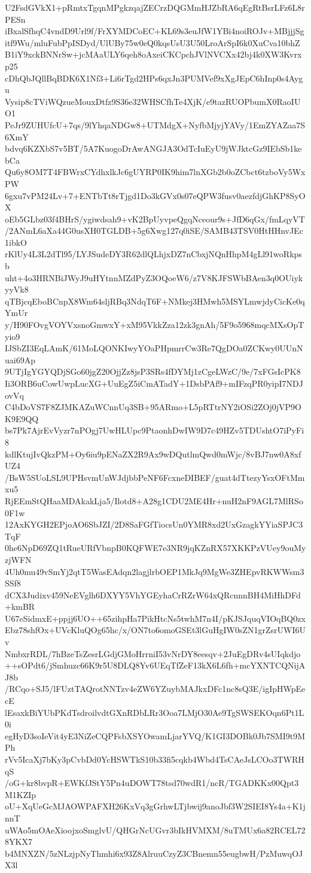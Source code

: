 U2FsdGVkX1+pRmtxTgqnMPgkzqajZECrzDQGMmHJZbRA6qEgRtBsrLFz6L8rPESn
iBxalSfhqC4vndD9Url9f/FrXYMDCoEC+KL69s3euJfW1YBi4noiROJv+MBjjjSg
itf9Wu/mluFubPpISDyd/UlUBy75w0eQ0kqsUsU3U50LroArSpI6k0XuCva10bhZ
B1iY9xckBNNrSw+jcMAaULY6qeh8oAxeiCKCpchJVlNVCXx42bj4k0XW3Kvrxp25
cDhQbJQllBqBDK6X1Nf3+Li6rTgd2HPs6qxJn3PUMVef9xXgJEpC6hInp0s4Aygu
Vysip8cTViWQzueMouxDtfz9S36e32WHSCfhTe4XjK/e9tazRUOPbumX0RaoIUO1
PeJr9ZUHUfcU+7qs/9lYhqaNDGw8+UTMdgX+NyfbMjyjYAVy/1EmZYAZaa7S6XmY
bdvq6KZXbS7v5BT/5A7KuogoDrAwANGJA3OdTcIuEyU9jWJktcGz9IEbSb1kebCa
Qu6y8OM7T4FBWrxCYdhxlkJc6gUYRP0IK9him7lnXGb2b0oZCbct6tzboVy5WxPW
6gxu7vPM24Lv+7+ENTbTt8rTjgd1Do3kGVx0s07eQPW3fusv0aezfdjGhKP8SyOX
oEb5GLbz03f4BHrS/ygiwdsah9+vK2BpUyvpeQgqNceour9s+JfD6qGx/fmLqyVT
/2ANmL6aXa44G0usXH0TGLDB+5g6Xwg127q0iSE/SAMB43TSV0HtHHnvJEc1ibkO
rKlUy4L3L2dTl95/LYJSudeDY3R62dlQLhjxDZ7nCbxjNQnHhpM4gLl91woRkpsb
uht+4o3HRNBiJWyJ9uHYtnnMZdPyZ3OQoeW6/z7V8KJFSWbBAen3q0OUiykyyVk8
qTBjcqEboBCnpX8Wm64sljRBq3NdqT6F+NMkej3HMwh5MSYLmwjdyCicKe0qYmUr
y/H90FOvgVOYVxsnoGmwxY+xM95VkkZza12zk3gnAh/5F9o5968mqcMXsOpTyio9
IJSbZI3EqLAmK/61MoLQONKIwyYOaPHpmrrCw3Re7QgDOa0ZCKwy0UUnNuai69Ap
9UTjIgYGYQDjSGo60jgZ20OjjZz8jsP3SRs4fDYMj1zCgeLWzC/9e/7xFGsIcPK8
Ii3ORB6uCowUwpLucXG+UuEgZ5iCmATadY+1DsbPAf9+mIFzqPR0yipI7NDJovVq
C4bDoVS7F8ZJMKAZuWCnnUq3SB+95ARmo+L5pRTtrNY2iOSi2ZOj0jVP9OK9E9QQ
bs7Pk7AjrEvVyzr7nPOgj7UwHLUpc9PtaonhDwIW9D7c49HZv5TDUshtO7iPyFi8
kdlKtujIvQkzPM+Oy6iu9pENaZX2R9Ax9wDQutlmQwd0mWjc/8vBJ7nw0A8xfUZ4
/BsW5SUoLSL9UPHsvmUnWJdjbbPeNF6FcxneDIBEF/guat4dTtezyYsxOFtMmxu5
RjEEmStQHaaMDAkakLja5/Ilotd8+A28g1CDU2ME4Hr+nuH2nF9AGL7MlRSo0F1w
12AxKYGH2EPjoAO6SbJZI/2D8SaFGfTiocsUn0YMR8xd2UxGzagkYYiaSPJC3TqF
0he6NpD69ZQ1tRueURfVbnpB0KQFWE7e3NR9jqKZnRX57XKKPzVUey9ouMyzjWFN
4Uh0mu49vSmYj2qtT5WasEAdqn2lagjlrbOEP1MkJq9MgWe3ZHEpvRKWWsm3SSf8
dCX3Judixv459NeEVglh6DXYY5VhYGEyhaCrRZrW64xQRcnnnBH4MiHhDFd+kmBR
U67eSidmxE+ppjj6UO++65zihpHa7PikHtcNs5twhM7n4I/pKJSJquqVIOqBQ0zx
Ebz78shfOx+UVcKluQOg65hc/x/ON7to6omoGSEt3lGuHgIW0sZN1grZsrUWI6Uv
NmbxrRDL/7hBzeTsZesrLGdjGMoHrrniI53vNrDY8eesqv+2JuEgDRv4sUIqkdjo
++sOPdt6/jSmhuzc66K9r5U8DLQ8Yv6UEqTfZeF13kX6L6fh+mcYXNTCQNijAJ8b
/RCqo+SJ5/lFUztTAQrotNNTzv4eZW6YZuybMAJkxDFc1nc8sQ3E/igIpHWpEecE
lEsaxkBiYUbPKdTsdroilvdtGXnRDbLRr3Ooa7LMjO30Ae9TgSWSEKOqn6Pt1L0i
egHyD3soIeVit4yE3NiZeCQPFsbXSYOwamLjarYVQ/K1GI3DOBk0Jb7SMI9t9MPh
rVv5IcaXj7bKy3pCvbDd0YcHSWTkS10b33fi5cqkb4Wbd4TsCAeJsLCOo3TWRHqS
/oG+kr8bvpR+EWKfJStY5Pn4uDOWT78tsd70wdR1/ncR/TGADKKx00Qpt3M1KZIp
oU+XqUeGcMJAOWPAFXH26KxVq3gGrhwLTjbwij9anoJbf3W2SIEI8Ys4a+K1jnnT
uWAo5mOAeXioojxoSmglvU/QHGrNcUGvr3bIkHVMXM/8uTMUx6a82RCEL728YKX7
b4MNXZN/5zNLzjpNyThmhi6x93Z8AlruuCzyZ3CBnemn55eugbwH/PzMuwqOJX3l
